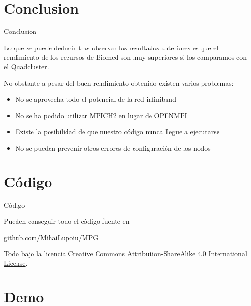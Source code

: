 \documentclass[10pt]{beamer}
\begin{document}
\section{Conclusion}
\begin{frame}{Conclusion}

  Lo que se puede deducir tras observar los resultados anteriores es que el rendimiento de los recursos de Biomed son muy superiores si los comparamos con el Quadcluster.
  
  No obstante a pesar del buen rendimiento obtenido existen varios problemas:

\begin{itemize}
\item No se aprovecha todo el potencial de la red infiniband
\item No se ha podido utilizar MPICH2 en lugar de OPENMPI
\item Existe la posibilidad de que nuestro código nunca llegue a ejecutarse
\item No se pueden prevenir otros errores de configuración de los nodos
\end{itemize}
    
\end{frame}
\section{Código}
\begin{frame}{Código}

  Pueden conseguir todo el código fuente en
  \begin{center}\url{github.com/MihaiLupoiu/MPG}\end{center}

  Todo bajo la licencia
  \href{http://creativecommons.org/licenses/by-sa/4.0/}{Creative Commons
  Attribution-ShareAlike 4.0 International License}.

  \begin{center}\ccbysa\end{center}

\end{frame}
\section{Demo}
\end{document}
